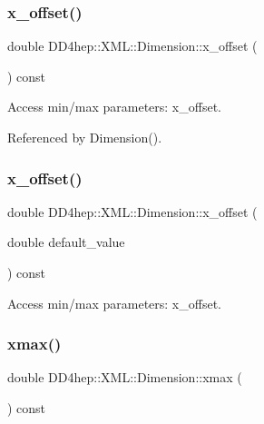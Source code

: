 \subsubsection{\texorpdfstring{x\+\_\+offset()}{x\_offset()}\hspace{0.1cm}{\footnotesize\ttfamily [1/2]}}
{\footnotesize\ttfamily double D\+D4hep\+::\+X\+M\+L\+::\+Dimension\+::x\+\_\+offset (\begin{DoxyParamCaption}{ }\end{DoxyParamCaption}) const}



Access min/max parameters\+: x\+\_\+offset. 



Referenced by Dimension().

\hypertarget{struct_d_d4hep_1_1_x_m_l_1_1_dimension_aecadb2c6b0fa885ad1eaab2ff0c7228b}{}\label{struct_d_d4hep_1_1_x_m_l_1_1_dimension_aecadb2c6b0fa885ad1eaab2ff0c7228b} 
\subsubsection{\texorpdfstring{x\+\_\+offset()}{x\_offset()}\hspace{0.1cm}{\footnotesize\ttfamily [2/2]}}
{\footnotesize\ttfamily double D\+D4hep\+::\+X\+M\+L\+::\+Dimension\+::x\+\_\+offset (\begin{DoxyParamCaption}\item[{double}]{default\+\_\+value }\end{DoxyParamCaption}) const}



Access min/max parameters\+: x\+\_\+offset. 

\hypertarget{struct_d_d4hep_1_1_x_m_l_1_1_dimension_a10d4fb0c07e0fc08e34a482b88f886fe}{}\label{struct_d_d4hep_1_1_x_m_l_1_1_dimension_a10d4fb0c07e0fc08e34a482b88f886fe} 
\subsubsection{\texorpdfstring{xmax()}{xmax()}\hspace{0.1cm}{\footnotesize\ttfamily [1/2]}}
{\footnotesize\ttfamily double D\+D4hep\+::\+X\+M\+L\+::\+Dimension\+::xmax (\begin{DoxyParamCaption}{ }\end{DoxyParamCaption}) const}



